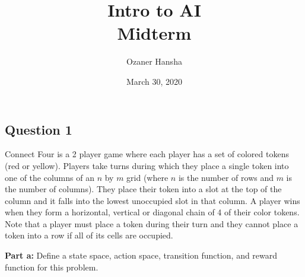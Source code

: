 \documentclass{article}
\begin{document}
\title{Intro to AI\\ Midterm}
\author{Ozaner Hansha}
\date{March 30, 2020}
\maketitle

\subsection*{Question 1}
Connect Four is a 2 player game where each player has a set of colored tokens (red or yellow). Players take turns during which they place a single token into one of the columns of an $n$ by $m$ grid (where $n$ is the number of rows and $m$ is the number of columns). They place their token into a slot at the top of the column and it falls into the lowest unoccupied slot in that column. A player wins when they form a horizontal, vertical or diagonal chain of 4 of their color tokens. Note that a player must place a token during their turn and they cannot place a token into a row if all of its cells are occupied.
\bigskip

\newcommand{\ye}{\tikz\draw[Goldenrod,fill=Goldenrod] (0,0) circle (.5ex);}
\newcommand{\re}{\tikz\draw[red,fill=red] (0,0) circle (.5ex);}

\noindent\textbf{Part a:} Define a state space, action space, transition function, and reward function for this problem.
\bigskip
\end{document}
